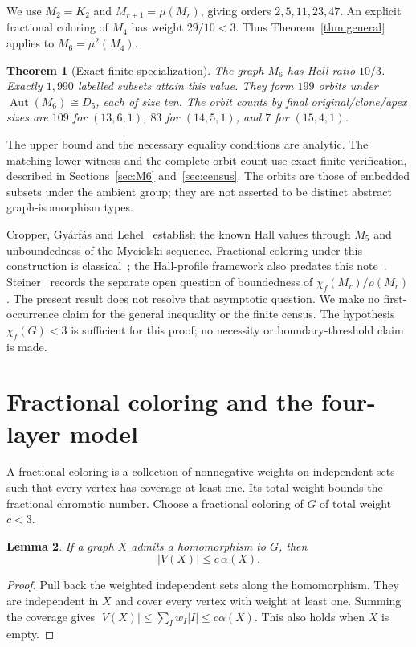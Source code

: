 \documentclass[11pt,letterpaper]{article}
\newtheorem{theorem}{Theorem}[section]
\newtheorem{lemma}[theorem]{Lemma}
\theoremstyle{remark}
\DeclareMathOperator{\Aut}{Aut}
\newcommand{\abs}[1]{\lvert #1\rvert}
\begin{document}
We use $M_2=K_2$ and $M_{r+1}=\mu(M_r)$, giving orders $2,5,11,23,47$.
An explicit fractional coloring of $M_4$ has weight $29/10<3$. Thus
Theorem~\ref{thm:general} applies to $M_6=\mu^2(M_4)$.

\begin{theorem}[Exact finite specialization]\label{thm:census}
The graph $M_6$ has Hall ratio $10/3$. Exactly $1,990$ labelled subsets
attain this value. They form $199$ orbits under $\Aut(M_6)\cong D_5$,
each of size ten. The orbit counts by final original/clone/apex sizes are
$109$ for $(13,6,1)$, $83$ for $(14,5,1)$, and $7$ for $(15,4,1)$.
\end{theorem}

The upper bound and the necessary equality conditions are analytic.
The matching lower witness and the complete orbit count use exact finite
verification, described in Sections~\ref{sec:M6} and~\ref{sec:census}.
The orbits are those of embedded subsets under the ambient group; they
are not asserted to be distinct abstract graph-isomorphism types.

Cropper, Gy\'arf\'as and Lehel~\cite{CGL} establish the known Hall values
through $M_5$ and unboundedness of the Mycielski sequence. Fractional
coloring under this construction is classical~\cite{LPU}; the Hall-profile
framework also predates this note~\cite{Barnett}. Steiner~\cite{Steiner}
records the separate open question of boundedness of
$\chi_f(M_r)/\rho(M_r)$. The present result does not resolve that
asymptotic question. We make no first-occurrence claim for the general
inequality or the finite census. The hypothesis $\chi_f(G)<3$ is sufficient
for this proof; no necessity or boundary-threshold claim is made.

\section{Fractional coloring and the four-layer model}
A fractional coloring is a collection of nonnegative weights on
independent sets such that every vertex has coverage at least one.
Its total weight bounds the fractional chromatic number. Choose a
fractional coloring of $G$ of total weight $c<3$.

\begin{lemma}\label{lem:projection}
If a graph $X$ admits a homomorphism to $G$, then
\begin{equation}\label{eq:projection}
 \abs{V(X)}\le c\,\alpha(X).
\end{equation}
\end{lemma}
\begin{proof}
Pull back the weighted independent sets along the homomorphism. They
are independent in $X$ and cover every vertex with weight at least one.
Summing the coverage gives
$\abs{V(X)}\le\sum_I w_I\abs I\le c\alpha(X)$.
This also holds when $X$ is empty.
\end{proof}
\end{document}
